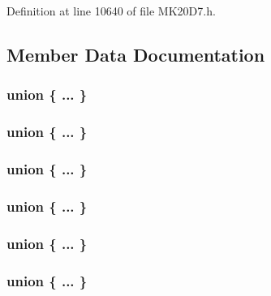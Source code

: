 Definition at line 10640 of file M\+K20\+D7.\+h.



\subsection{Member Data Documentation}
\subsubsection[{\texorpdfstring{"@126}{@126}}]{\setlength{\rightskip}{0pt plus 5cm}union \{ ... \} }\hypertarget{struct_s_p_i___mem_map_a33fe1859dade18490f88f75e4de9150f}{}\label{struct_s_p_i___mem_map_a33fe1859dade18490f88f75e4de9150f}
\subsubsection[{\texorpdfstring{"@128}{@128}}]{\setlength{\rightskip}{0pt plus 5cm}union \{ ... \} }\hypertarget{struct_s_p_i___mem_map_a2f03735d376ae47f1447a291314d158c}{}\label{struct_s_p_i___mem_map_a2f03735d376ae47f1447a291314d158c}
\subsubsection[{\texorpdfstring{"@35}{@35}}]{\setlength{\rightskip}{0pt plus 5cm}union \{ ... \} }\hypertarget{struct_s_p_i___mem_map_a8432be68ef8c96529a5a6c05fb5ccfb3}{}\label{struct_s_p_i___mem_map_a8432be68ef8c96529a5a6c05fb5ccfb3}
\subsubsection[{\texorpdfstring{"@37}{@37}}]{\setlength{\rightskip}{0pt plus 5cm}union \{ ... \} }\hypertarget{struct_s_p_i___mem_map_a27dde4254f9c1e98757c826458880f34}{}\label{struct_s_p_i___mem_map_a27dde4254f9c1e98757c826458880f34}
\subsubsection[{\texorpdfstring{"@86}{@86}}]{\setlength{\rightskip}{0pt plus 5cm}union \{ ... \} }\hypertarget{struct_s_p_i___mem_map_a34b06bbd0d41d3de77bc1c9b5f9be05d}{}\label{struct_s_p_i___mem_map_a34b06bbd0d41d3de77bc1c9b5f9be05d}
\subsubsection[{\texorpdfstring{"@88}{@88}}]{\setlength{\rightskip}{0pt plus 5cm}union \{ ... \} }\hypertarget{struct_s_p_i___mem_map_a72993ef7e72b38899166bbec93edc406}{}\label{struct_s_p_i___mem_map_a72993ef7e72b38899166bbec93edc406}
